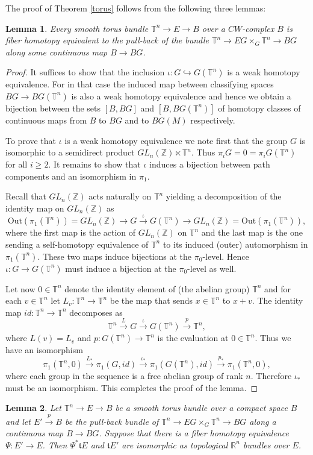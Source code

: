 \documentclass[onecolumn,notitlepage,11pt]{article}
\newcommand{\Z}{\mathbb{Z}}
\newcommand{\R}{\mathbb{R}}
\newcommand{\T}{\mathbb{T}}
\newcommand{\beq}{\begin{equation*}}
\newcommand{\eeq}{\end{equation*}}
\newtheorem{lemma}{Lemma}[section]
\theoremstyle{definition}
\begin{document}
The proof of Theorem \ref{torus} follows from the following three lemmas:
\begin{lemma}\label{pull-back}
Every smooth torus bundle $\T^n\to E\to B$ over a $CW$-complex $B$
is fiber homotopy equivalent
to the pull-back of the bundle $\T^n\to EG\times_G\T^n\to BG$ 
along some continuous map
$B\to BG$.
\end{lemma}
\begin{proof}
It suffices to show that the inclusion $\iota: G\hookrightarrow G(\T^n)$ 
is a weak homotopy equivalence. For in that case the induced map between
classifying spaces
 $BG\to BG(\T^n)$ is also a weak homotopy equivalence and hence we obtain a bijection 
 between the sets $[B,BG]$ and $[B,BG(\T^n)]$ of homotopy classes of 
 continuous maps from $B$ to $BG$  and to $BG(M)$ respectively.
 
 To prove that $\iota$ is a weak homotopy equivalence we note first that
 the group $G$ is isomorphic to a semidirect product $GL_n(\Z)\ltimes\T^n$.
 Thus $\pi_iG=0=\pi_iG(\T^n)$ for all $i\geq 2$. It remains to show
 that $\iota$ induces a bijection between path components 
 and an isomorphism in $\pi_1$.

Recall that $GL_n(\Z)$ acts naturally on $\T^n$ yielding a decomposition
of the identity map on $GL_n(\Z)$ as
\beq
\mbox{Out}(\pi_1(\T^n))=GL_n(\Z)\to G\xrightarrow{\iota}G(\T^n)\to
GL_n(\Z)=\mbox{Out}(\pi_1(\T^n)),
\eeq
where the first map is the action of $GL_n(\Z)$ on $\T^n$ and the last map
is the one sending a self-homotopy equivalence of $\T^n$ to its induced
(outer) automorphism in $\pi_1(\T^n)$. These two maps induce bijections at the
$\pi_0$-level. Hence $\iota:G\to G(\T^n)$ must induce a bijection at the
$\pi_0$-level as well.

Let now $0\in\T^n$ denote the identity element of 
(the abelian group) $\T^n$ and for each
$v\in\T^n$ let $L_v:\T^n\to \T^n$ be the map that sends $x\in\T^n$ to $x+v$.
The identity map $id:\T^n\to\T^n$ decomposes as
\beq
\T^n\xrightarrow{L} G\xrightarrow{\iota}G(\T^n)\xrightarrow{p}\T^n,
\eeq
where $L(v)=L_v$ and $p:G(\T^n)\to\T^n$ is the evaluation at $0\in\T^n$. Thus 
we have an isomorphism
\beq
\pi_1(\T^n,0)\xrightarrow{L_*}\pi_1(G,id)\xrightarrow{\iota_*}
\pi_1(G(\T^n),id)\xrightarrow{p_*}\pi_1(\T^n,0),
\eeq
where each group in the sequence is a free abelian group of rank $n$.
Therefore $\iota_*$
must be an isomorphism. This completes the proof of the lemma. 
\end{proof}
\begin{lemma}\label{affineflat}
Let  $\T^n\to E\to B$ be a smooth torus bundle over a compact space
$B$ and let $E'\xrightarrow{p}B$ be the pull-back bundle of 
$\T^n\to EG\times_G\T^n\to BG$ along a continuous map $B\to BG$.
Suppose that
there is a fiber homotopy equivalence $\Psi:E'\to E$. Then 
$\Psi^*\mathfrak{t}E$ and $\mathfrak{t}E'$ are isomorphic as topological
$\R^n$ bundles over $E$.
\end{lemma}
\end{document}
